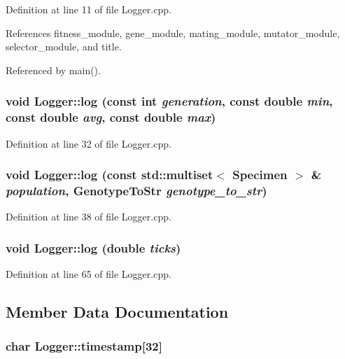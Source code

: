Definition at line 11 of file Logger.cpp.

References fitness\_\-module, gene\_\-module, mating\_\-module, mutator\_\-module, selector\_\-module, and title.

Referenced by main().\hypertarget{classLogger_a71ff6844276c6ad8f185355c702e45c}{
\subsubsection{\setlength{\rightskip}{0pt plus 5cm}void Logger::log (const int {\em generation}, const double {\em min}, const double {\em avg}, const double {\em max})}}
\label{classLogger_a71ff6844276c6ad8f185355c702e45c}




Definition at line 32 of file Logger.cpp.\hypertarget{classLogger_8db4457cb08db152c66515638d3194c6}{
\subsubsection{\setlength{\rightskip}{0pt plus 5cm}void Logger::log (const std::multiset$<$ {\bf Specimen} $>$ \& {\em population}, {\bf GenotypeToStr} {\em genotype\_\-to\_\-str})}}
\label{classLogger_8db4457cb08db152c66515638d3194c6}




Definition at line 38 of file Logger.cpp.\hypertarget{classLogger_6cca2f66151bd00838489fde4b769a38}{
\subsubsection{\setlength{\rightskip}{0pt plus 5cm}void Logger::log (double {\em ticks})}}
\label{classLogger_6cca2f66151bd00838489fde4b769a38}




Definition at line 65 of file Logger.cpp.

\subsection{Member Data Documentation}
\hypertarget{classLogger_34ba341a540e08e318113217fa524345}{
\subsubsection{\setlength{\rightskip}{0pt plus 5cm}char {\bf Logger::timestamp}\mbox{[}32\mbox{]}}}
\label{classLogger_34ba341a540e08e318113217fa524345}




